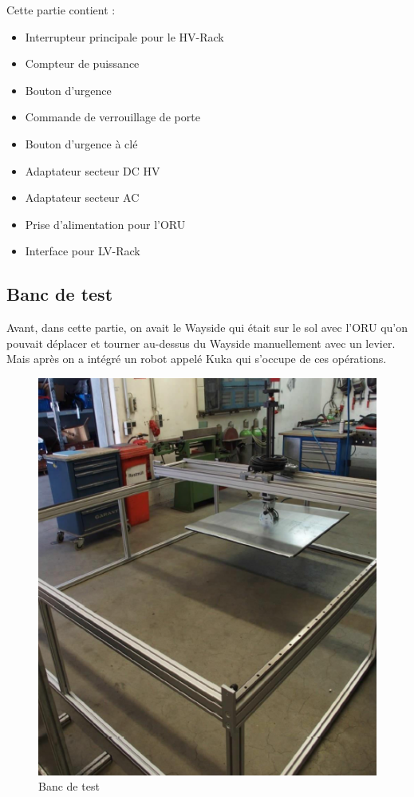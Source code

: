 \noindent Cette partie contient :

\begin{itemize}
	\item Interrupteur principale pour le HV-Rack
	\item Compteur de puissance
	\item Bouton d’urgence
	\item Commande de verrouillage de porte
	\item Bouton d’urgence à clé
	\item Adaptateur secteur DC HV
	\item Adaptateur secteur AC
	\item Prise d’alimentation pour l’ORU
	\item Interface pour LV-Rack
\end{itemize}

\subsection{Banc de test}

Avant, dans cette partie, on avait le Wayside qui était sur le sol avec l’ORU qu’on pouvait déplacer et tourner au-dessus du Wayside manuellement avec un levier. Mais après on a intégré un robot appelé Kuka qui s’occupe de ces opérations.

\begin{figure}[H]
 \centering
 \includegraphics[scale=0.8]{images/banc_test}
 \caption{Banc de test}
\end{figure}

